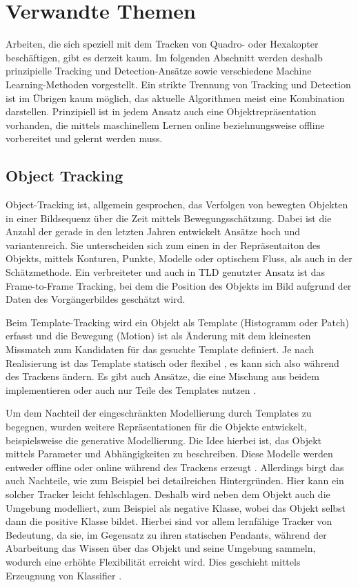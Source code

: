 \section {Verwandte Themen }
Arbeiten, die sich speziell mit dem Tracken von Quadro- oder Hexakopter beschäftigen, gibt es derzeit kaum. Im folgenden Abschnitt werden deshalb prinzipielle Tracking und Detection-Ansätze sowie verschiedene Machine Learning-Methoden vorgestellt. Ein strikte Trennung von Tracking und Detection ist im Übrigen kaum möglich, das aktuelle Algorithmen meist eine Kombination darstellen. Prinzipiell ist in jedem Ansatz auch eine Objektrepräsentation vorhanden, die mittels maschinellem Lernen online beziehnungsweise offline vorbereitet und gelernt werden muss.

\subsection{Object Tracking}
Object-Tracking ist, allgemein gesprochen, das Verfolgen von bewegten Objekten in einer Bildsequenz über die Zeit mittels Bewegungsschätzung. Dabei ist die Anzahl der gerade in den letzten Jahren entwickelt Ansätze hoch und variantenreich. Sie unterscheiden sich zum einen in der Repräsentaiton des Objekts, mittels Konturen, Punkte, Modelle oder optischem Fluss, als auch in der Schätzmethode. Ein verbreiteter und auch in TLD genutzter Ansatz ist das Frame-to-Frame Tracking, bei dem die Position des Objekts im Bild aufgrund der Daten des Vorgängerbildes geschätzt wird.

Beim Template-Tracking \cite{OPT}\cite{GFT}\cite{KBT} wird ein Objekt als Template (Histogramm oder Patch) erfasst und die Bewegung (Motion) ist als Änderung mit dem kleinesten Missmatch zum Kandidaten für das gesuchte Template definiert. Je nach Realisierung ist das Template statisch\cite{KBT} oder flexibel \cite{OPT}\cite{GFT}, es kann sich also während des Trackens ändern. Es gibt auch Ansätze, die eine Mischung aus beidem implementieren \cite{TUP}\cite{SMAT}\cite{RDT} oder auch nur Teile des Templates nutzen \cite{ROAM}\cite{RFT}.

Um dem Nachteil der eingeschränkten Modellierung durch Templates zu begegnen, wurden weitere Repräsentationen für die Objekte entwickelt, beispielsweise die generative Modellierung. Die Idee hierbei ist, das Objekt mittels Parameter und Abhängigkeiten zu beschreiben. Diese Modelle werden entweder offline \cite{ETR} oder online während des Trackens erzeugt \cite{RFT}\cite{VTD}. Allerdings birgt das auch Nachteile, wie zum Beispiel bei detailreichen Hintergründen. Hier kann ein solcher Tracker leicht fehlschlagen. Deshalb wird neben dem Objekt auch die Umgebung modelliert, zum Beispiel als negative Klasse, wobei das Objekt selbst dann die positive Klasse bildet. Hierbei sind vor allem lernfähige Tracker von Bedeutung, da sie, im Gegensatz zu ihren statischen Pendants, während der Abarbeitung das Wissen über das Objekt und seine Umgebung sammeln, wodurch eine erhöhte Flexibilität erreicht wird. Dies geschieht mittels Erzeugnung von Klassifier \cite{ONS}\cite{ENT}\cite{OBT}.

